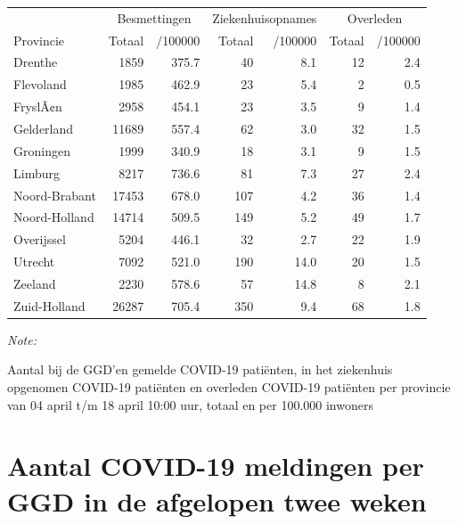 \documentclass[
  english,
  man,floatsintext]{apa6}
\begin{document}
\begin{table}
\centering
\begin{threeparttable}
\begin{tabular}{lrrrrrr}
\toprule
\multicolumn{1}{c}{ } & \multicolumn{2}{c}{Besmettingen} & \multicolumn{2}{c}{Ziekenhuisopnames} & \multicolumn{2}{c}{Overleden} \\
\cmidrule(l{3pt}r{3pt}){2-3} \cmidrule(l{3pt}r{3pt}){4-5} \cmidrule(l{3pt}r{3pt}){6-7}
Provincie & Totaal & /100000 & Totaal & /100000 & Totaal & /100000\\
\midrule
Drenthe & 1859 & 375.7 & 40 & 8.1 & 12 & 2.4\\
Flevoland & 1985 & 462.9 & 23 & 5.4 & 2 & 0.5\\
FryslÃ¢n & 2958 & 454.1 & 23 & 3.5 & 9 & 1.4\\
Gelderland & 11689 & 557.4 & 62 & 3.0 & 32 & 1.5\\
Groningen & 1999 & 340.9 & 18 & 3.1 & 9 & 1.5\\
Limburg & 8217 & 736.6 & 81 & 7.3 & 27 & 2.4\\
Noord-Brabant & 17453 & 678.0 & 107 & 4.2 & 36 & 1.4\\
Noord-Holland & 14714 & 509.5 & 149 & 5.2 & 49 & 1.7\\
Overijssel & 5204 & 446.1 & 32 & 2.7 & 22 & 1.9\\
Utrecht & 7092 & 521.0 & 190 & 14.0 & 20 & 1.5\\
Zeeland & 2230 & 578.6 & 57 & 14.8 & 8 & 2.1\\
Zuid-Holland & 26287 & 705.4 & 350 & 9.4 & 68 & 1.8\\
\bottomrule
\end{tabular}
\begin{tablenotes}
\item \textit{Note: } 
\item Aantal bij de GGD’en gemelde COVID-19 patiënten, in het ziekenhuis opgenomen COVID-19 patiënten en overleden COVID-19 patiënten per provincie van 04 april t/m 18 april 10:00 uur, totaal en per 100.000 inwoners
\end{tablenotes}
\end{threeparttable}
\end{table}

\newpage

\hypertarget{aantal-covid-19-meldingen-per-ggd-in-de-afgelopen-twee-weken}{%
\section{Aantal COVID-19 meldingen per GGD in de afgelopen twee weken}\label{aantal-covid-19-meldingen-per-ggd-in-de-afgelopen-twee-weken}}
\end{document}
